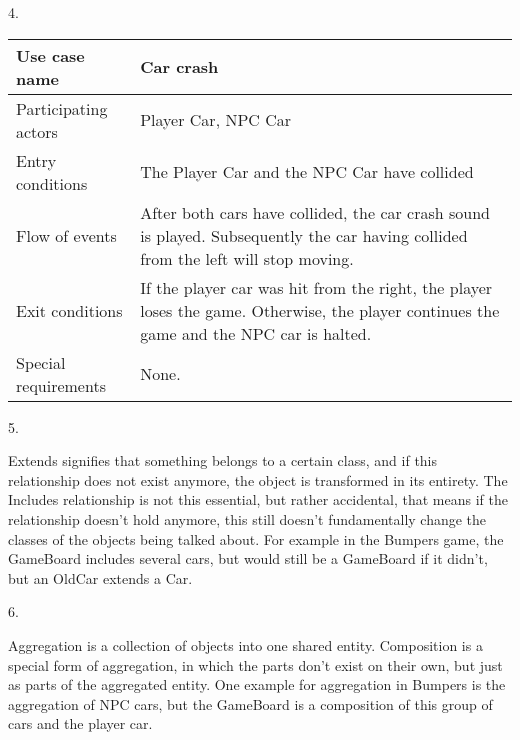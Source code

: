 \documentclass[11pt,a4paper]{article}
\begin{document}
4.

\begin{tabular}{l | p{100mm}}
Use case name & Car crash \\
\hline
Participating actors & Player Car, NPC Car \\
\hline
Entry conditions & The Player Car and the NPC Car have collided \\
\hline
Flow of events & After both cars have collided, the car crash sound is played. Subsequently the car having collided from the left will stop moving. \\
\hline
Exit conditions & If the player car was hit from the right, the player loses the game. Otherwise, the player continues the game and the NPC car is halted. \\
\hline
Special requirements & None. \\
\end{tabular}

5.

Extends signifies that something belongs to a certain class, and
if this relationship does not exist anymore, the object is transformed in
its entirety.  The Includes relationship is not this essential, but
rather accidental, that means if the relationship doesn't hold anymore,
this still doesn't fundamentally change the classes of the objects being
talked about. For example in the Bumpers game, the GameBoard includes
several cars, but would still be a GameBoard if it didn't, but an OldCar
extends a Car.

6.

Aggregation is a collection of objects into one shared entity. Composition
is a special form of aggregation, in which the parts don't exist on their
own, but just as parts of the aggregated entity. One example for aggregation
in Bumpers is the aggregation of NPC cars, but the GameBoard is a composition
of this group of cars and the player car.
\end{document}
